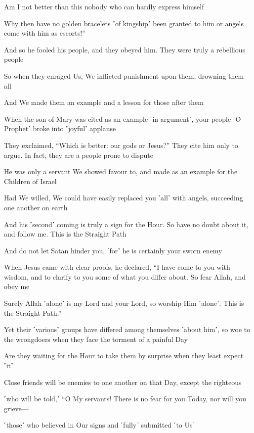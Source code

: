 Am I not better than this nobody who can hardly express himself

Why then have no golden bracelets ˹of kingship˺ been granted to him or angels come with him as escorts!”

And so he fooled his people, and they obeyed him. They were truly a rebellious people

So when they enraged Us, We inflicted punishment upon them, drowning them all

And We made them an example and a lesson for those after them

When the son of Mary was cited as an example ˹in argument˺, your people ˹O Prophet˺ broke into ˹joyful˺ applause

They exclaimed, “Which is better: our gods or Jesus?” They cite him only to argue. In fact, they are a people prone to dispute

He was only a servant We showed favour to, and made as an example for the Children of Israel

Had We willed, We could have easily replaced you ˹all˺ with angels, succeeding one another on earth

And his ˹second˺ coming is truly a sign for the Hour. So have no doubt about it, and follow me. This is the Straight Path

And do not let Satan hinder you, ˹for˺ he is certainly your sworn enemy

When Jesus came with clear proofs, he declared, “I have come to you with wisdom, and to clarify to you some of what you differ about. So fear Allah, and obey me

Surely Allah ˹alone˺ is my Lord and your Lord, so worship Him ˹alone˺. This is the Straight Path.”

Yet their ˹various˺ groups have differed among themselves ˹about him˺, so woe to the wrongdoers when they face the torment of a painful Day

Are they waiting for the Hour to take them by surprise when they least expect ˹it˺

Close friends will be enemies to one another on that Day, except the righteous

˹who will be told,˺ “O My servants! There is no fear for you Today, nor will you grieve—

˹those˺ who believed in Our signs and ˹fully˺ submitted ˹to Us˺

